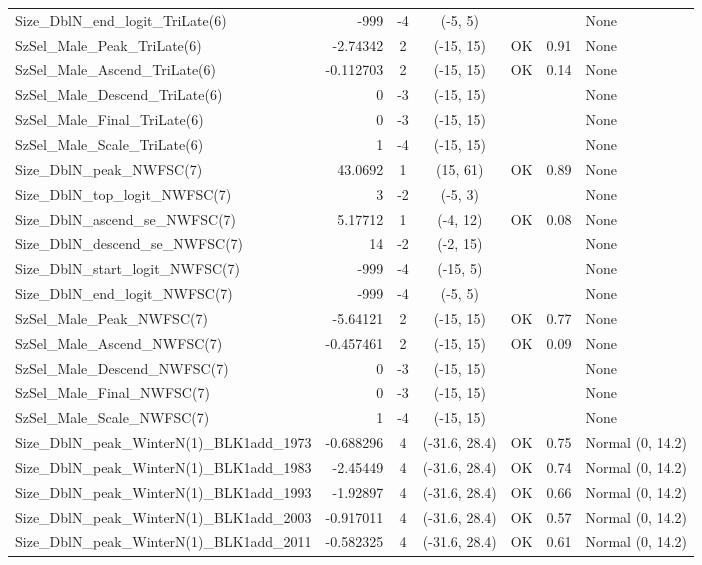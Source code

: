 \documentclass[12pt,]{article}
\begin{document}
\begin{landscape}
\begin{longtable}{lrcccll}
  Size\_DblN\_end\_logit\_TriLate(6) & -999 & -4 & (-5, 5) &  &  & None \\ 
  SzSel\_Male\_Peak\_TriLate(6) & -2.74342 & 2 & (-15, 15) & OK & 0.91 & None \\ 
  SzSel\_Male\_Ascend\_TriLate(6) & -0.112703 & 2 & (-15, 15) & OK & 0.14 & None \\ 
  SzSel\_Male\_Descend\_TriLate(6) & 0 & -3 & (-15, 15) &  &  & None \\ 
  SzSel\_Male\_Final\_TriLate(6) & 0 & -3 & (-15, 15) &  &  & None \\ 
  SzSel\_Male\_Scale\_TriLate(6) & 1 & -4 & (-15, 15) &  &  & None \\ 
  Size\_DblN\_peak\_NWFSC(7) & 43.0692 & 1 & (15, 61) & OK & 0.89 & None \\ 
  Size\_DblN\_top\_logit\_NWFSC(7) & 3 & -2 & (-5, 3) &  &  & None \\ 
  Size\_DblN\_ascend\_se\_NWFSC(7) & 5.17712 & 1 & (-4, 12) & OK & 0.08 & None \\ 
  Size\_DblN\_descend\_se\_NWFSC(7) & 14 & -2 & (-2, 15) &  &  & None \\ 
  Size\_DblN\_start\_logit\_NWFSC(7) & -999 & -4 & (-15, 5) &  &  & None \\ 
  Size\_DblN\_end\_logit\_NWFSC(7) & -999 & -4 & (-5, 5) &  &  & None \\ 
  SzSel\_Male\_Peak\_NWFSC(7) & -5.64121 & 2 & (-15, 15) & OK & 0.77 & None \\ 
  SzSel\_Male\_Ascend\_NWFSC(7) & -0.457461 & 2 & (-15, 15) & OK & 0.09 & None \\ 
  SzSel\_Male\_Descend\_NWFSC(7) & 0 & -3 & (-15, 15) &  &  & None \\ 
  SzSel\_Male\_Final\_NWFSC(7) & 0 & -3 & (-15, 15) &  &  & None \\ 
  SzSel\_Male\_Scale\_NWFSC(7) & 1 & -4 & (-15, 15) &  &  & None \\ 
  Size\_DblN\_peak\_WinterN(1)\_BLK1add\_1973 & -0.688296 & 4 & (-31.6, 28.4) & OK & 0.75 & Normal (0, 14.2) \\ 
  Size\_DblN\_peak\_WinterN(1)\_BLK1add\_1983 & -2.45449 & 4 & (-31.6, 28.4) & OK & 0.74 & Normal (0, 14.2) \\ 
  Size\_DblN\_peak\_WinterN(1)\_BLK1add\_1993 & -1.92897 & 4 & (-31.6, 28.4) & OK & 0.66 & Normal (0, 14.2) \\ 
  Size\_DblN\_peak\_WinterN(1)\_BLK1add\_2003 & -0.917011 & 4 & (-31.6, 28.4) & OK & 0.57 & Normal (0, 14.2) \\ 
  Size\_DblN\_peak\_WinterN(1)\_BLK1add\_2011 & -0.582325 & 4 & (-31.6, 28.4) & OK & 0.61 & Normal (0, 14.2) \\ 

\end{longtable}
\end{landscape}
\end{document}
